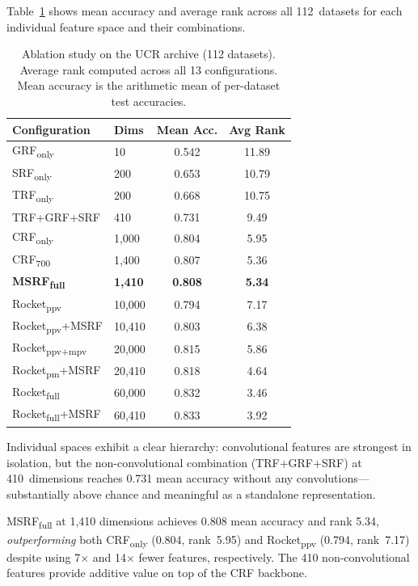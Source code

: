 \documentclass{article}
\begin{document}
Table~\ref{tab:ablation} shows mean accuracy and average rank across all 112~datasets for each individual feature space and their combinations.

\begin{table}[t]
  \caption{Ablation study on the UCR archive (112 datasets). Average rank computed across all 13 configurations. Mean accuracy is the arithmetic mean of per-dataset test accuracies.}
  \label{tab:ablation}
  \centering
  \small
  \begin{tabular}{@{}llcc@{}}
    \toprule
    Configuration & Dims & Mean Acc. & Avg Rank \\
    \midrule
    GRF\textsubscript{only}   & 10     & 0.542 & 11.89 \\
    SRF\textsubscript{only}   & 200    & 0.653 & 10.79 \\
    TRF\textsubscript{only}   & 200    & 0.668 & 10.75 \\
    TRF+GRF+SRF               & 410    & 0.731 &  9.49 \\
    \midrule
    CRF\textsubscript{only}   & 1{,}000  & 0.804 & 5.95 \\
    CRF\textsubscript{700}    & 1{,}400  & 0.807 & 5.36 \\
    \textbf{MSRF\textsubscript{full}} & \textbf{1{,}410} & \textbf{0.808} & \textbf{5.34} \\
    \midrule
    Rocket\textsubscript{ppv}      & 10{,}000  & 0.794 & 7.17 \\
    Rocket\textsubscript{ppv}+MSRF & 10{,}410  & 0.803 & 6.38 \\
    Rocket\textsubscript{ppv+mpv}  & 20{,}000  & 0.815 & 5.86 \\
    Rocket\textsubscript{pm}+MSRF  & 20{,}410  & 0.818 & 4.64 \\
    Rocket\textsubscript{full}     & 60{,}000  & 0.832 & 3.46 \\
    Rocket\textsubscript{full}+MSRF& 60{,}410  & 0.833 & 3.92 \\
    \bottomrule
  \end{tabular}
\end{table}

Individual spaces exhibit a clear hierarchy: convolutional features are strongest in isolation, but the non-convolutional combination (TRF+GRF+SRF) at 410~dimensions reaches 0.731 mean accuracy without any convolutions---substantially above chance and meaningful as a standalone representation.

MSRF\textsubscript{full} at 1{,}410 dimensions achieves 0.808 mean accuracy and rank 5.34, \emph{outperforming} both CRF\textsubscript{only} (0.804, rank~5.95) and Rocket\textsubscript{ppv} (0.794, rank~7.17) despite using 7$\times$ and 14$\times$ fewer features, respectively.
The 410 non-convolutional features provide additive value on top of the CRF backbone.
\end{document}
